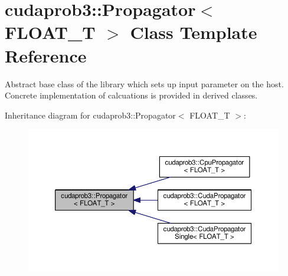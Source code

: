 \hypertarget{classcudaprob3_1_1Propagator}{}\section{cudaprob3\+:\+:Propagator$<$ F\+L\+O\+A\+T\+\_\+T $>$ Class Template Reference}
\label{classcudaprob3_1_1Propagator}


Abstract base class of the library which sets up input parameter on the host. Concrete implementation of calcuations is provided in derived classes.  




Inheritance diagram for cudaprob3\+:\+:Propagator$<$ F\+L\+O\+A\+T\+\_\+T $>$\+:\nopagebreak
\begin{figure}[H]
\begin{center}
\leavevmode
\includegraphics[width=350pt]{classcudaprob3_1_1Propagator__inherit__graph}
\end{center}
\end{figure}
